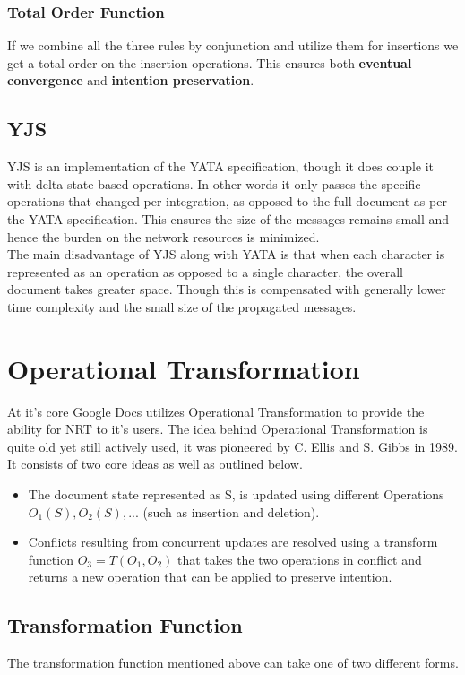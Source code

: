 \documentclass[12pt]{article}
\begin{document}
  \subsubsection{Total Order Function}
  If we combine all the three rules by conjunction and utilize them for insertions we get a total order on the insertion operations.
  This ensures both \textbf{eventual convergence} and \textbf{intention preservation}.

  \subsection{YJS}
  YJS is an implementation of the YATA specification, though it does couple it with delta-state based operations.
  In other words it only passes the specific operations that changed per integration, as opposed to the full document as per the YATA specification.
  This ensures the size of the messages remains small and hence the burden on the network resources is minimized.\\
  The main disadvantage of YJS along with YATA is that when each character is represented as an operation as opposed to a single character, the overall document takes greater space.
  Though this is compensated with generally lower time complexity and the small size of the propagated messages.

  \section{Operational Transformation}
  At it's core Google Docs utilizes Operational Transformation to provide the ability for NRT to it's users. 
  The idea behind Operational Transformation is quite old yet still actively used, it was pioneered by  C. Ellis and S. Gibbs in 1989.
  It consists of two core ideas as well as outlined below.

  \begin{itemize}
    \item The document state represented as S, is updated using different Operations \(O_{1}(S), O_{2}(S), ...\) (such as insertion and deletion).
    \item Conflicts resulting from concurrent updates are resolved using a transform function \(O_{3} = T(O_{1}, O_{2})\) that takes the two operations in conflict and returns a new operation that can be applied to preserve intention. 
  \end{itemize}

  \subsection{Transformation Function}
  The transformation function mentioned above can take one of two different forms.
\end{document}
